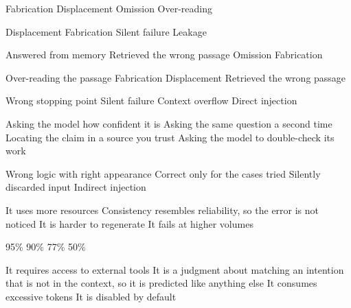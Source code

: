 \documentclass[11pt,a4paper]{article}
\begin{document}
\begin{questions}
  {Fabrication}
  {Displacement}
  {Omission}
  {Over-reading}

  {Displacement}
  {Fabrication}
  {Silent failure}
  {Leakage}

  {Answered from memory}
  {Retrieved the wrong passage}
  {Omission}
  {Fabrication}

  {Over-reading the passage}
  {Fabrication}
  {Displacement}
  {Retrieved the wrong passage}

  {Wrong stopping point}
  {Silent failure}
  {Context overflow}
  {Direct injection}

  {Asking the model how confident it is}
  {Asking the same question a second time}
  {Locating the claim in a source you trust}
  {Asking the model to double-check its work}

  {Wrong logic with right appearance}
  {Correct only for the cases tried}
  {Silently discarded input}
  {Indirect injection}

  {It uses more resources}
  {Consistency resembles reliability, so the error is not noticed}
  {It is harder to regenerate}
  {It fails at higher volumes}

  {95\%}
  {90\%}
  {77\%}
  {50\%}

  {It requires access to external tools}
  {It is a judgment about matching an intention that is not in the context, so it is predicted like anything else}
  {It consumes excessive tokens}
  {It is disabled by default}


\end{questions}
\end{document}
